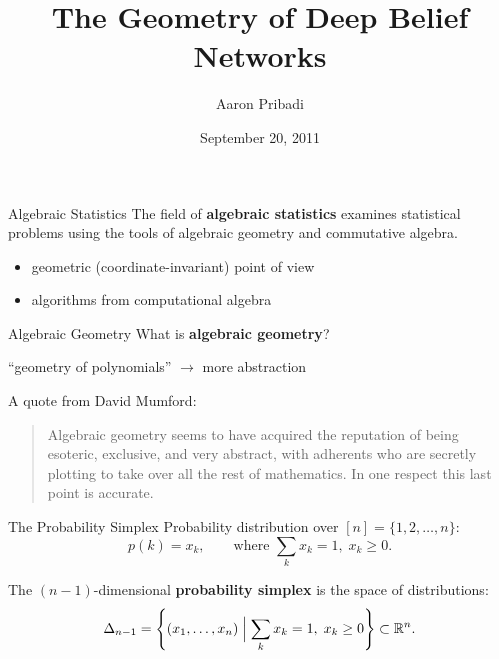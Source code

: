 \documentclass[mathserif,xcolor=dvipsnames]{beamer}
\title[The Geometry of DBNs]{The Geometry of Deep Belief Networks}
\author{Aaron Pribadi}
\institute[HMC]{Harvey Mudd College}
\date{September 20, 2011}
\renewcommand*{\R}{\mathbb{R}}
\begin{document}
\begin{frame}[plain]
    \maketitle
\end{frame}


\begin{frame}{Algebraic Statistics}
    The field of \textbf{algebraic statistics} examines statistical problems using
    the tools of algebraic geometry and commutative algebra.

    \linespace
    \begin{itemize}
    \item geometric (coordinate-invariant) point of view
    \item algorithms from computational algebra
    \end{itemize}
\end{frame}

\begin{frame}{Algebraic Geometry}
    What is \textbf{algebraic geometry}?
    \begin{center}
    ``geometry of polynomials'' \qquad $\longrightarrow$ \qquad more abstraction
    \end{center}

    \linespace
    A quote from David Mumford:

    \begin{quote}
    Algebraic geometry seems to have acquired the reputation of being esoteric,
    exclusive, and very abstract, with adherents who are secretly plotting to
    take over all the rest of mathematics. In one respect this last point is
    accurate.
    \end{quote}
\end{frame}

\begin{frame}{The Probability Simplex}
    Probability distribution over $[n] = \{1,2,\ldots, n\}$:
    \[
        p(k) = x_k,
        \qquad
        \text{where }
        \sum_k x_k = 1,
        \;
        x_k \ge 0.
    \]

    \pause
    
    
    The $(n-1)$-dimensional \textbf{probability simplex} is the space of
    distributions:
    \[
        \Delta_{n-1} = \cdil*{(x_1, \ldots, x_n) 
        \;\Bigl\vert\;
        \sum_k x_k = 1,\; x_k \ge 0}
        \subset
        \R^n.
    \]
\end{frame}
\end{document}
